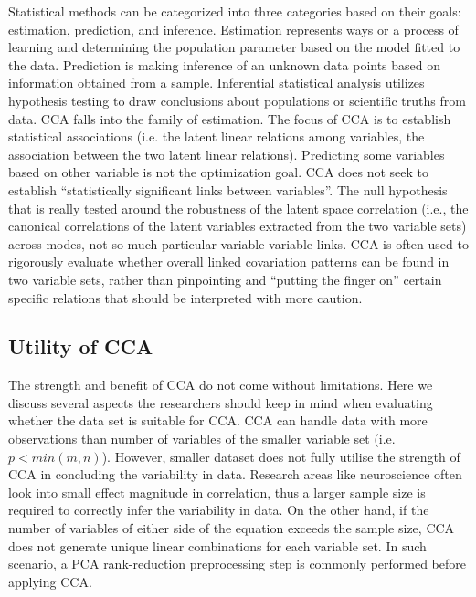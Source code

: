 Statistical methods can be categorized into three categories based on their goals: estimation, prediction, and inference.  Estimation represents ways or a process of learning and determining the population parameter based on the model fitted to the data. Prediction is making inference of an unknown data points based on information obtained from a sample. Inferential statistical analysis utilizes hypothesis testing to draw conclusions about populations or scientific truths from data. CCA falls into the family of estimation. The focus of CCA is to establish statistical associations (i.e. the latent linear relations among variables, the association between the two latent linear relations). Predicting some variables based on other variable is not the optimization goal. CCA does not seek to establish “statistically significant links between variables”. The null hypothesis that is really tested around the robustness of the latent space correlation (i.e., the canonical correlations of the latent variables extracted from the two variable sets) across modes, not so much particular variable-variable links. CCA is often used to rigorously evaluate whether overall linked covariation patterns can be found in two variable sets, rather than pinpointing and “putting the finger on” certain specific relations that should be interpreted with more caution.

\subsection{Utility of CCA}
\label{ch:methods:limitations}
The strength and benefit of CCA do not come without limitations. Here we discuss several aspects the researchers should keep in mind when evaluating whether the data set is suitable for CCA. CCA can handle data with more observations than number of variables of the smaller variable set (i.e. $p < min(m, n)$). However, smaller dataset does not fully utilise the strength of CCA in concluding the variability in data. Research areas like neuroscience often look into small effect magnitude in correlation, thus a larger sample size is required to correctly infer the variability in data. On the other hand, if the number of variables of either side of the equation exceeds the sample size, CCA does not generate unique linear combinations for each variable set. In such scenario, a PCA rank-reduction preprocessing step is commonly performed before applying CCA.

